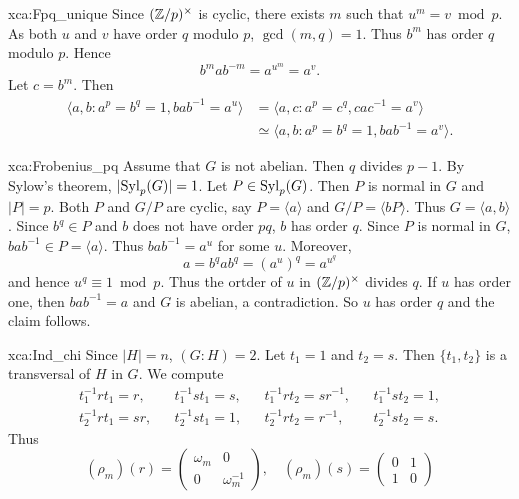 \begin{sol}{xca:Fpq_unique}
    Since $(\mathbb{Z}/p)^\times$ is cyclic, there exists $m$ such that $u^m=v\bmod p$. As both $u$ and $v$ have order $q$ modulo $p$, $\gcd(m,q)=1$. Thus $b^m$ has order $q$ modulo $p$. Hence 
    \[
    b^mab^{-m}=a^{u^m}=a^{v}.
    \]
    Let $c=b^m$. Then
    \begin{align*}
    \langle a,b:a^p=b^q=1,bab^{-1}=a^u\rangle 
    &= \langle a,c:a^p=c^q,cac^{-1}=a^v\rangle\\
    &\simeq \langle a,b:a^p=b^q=1,bab^{-1}=a^v\rangle.
    \end{align*}
\end{sol}

\begin{sol}{xca:Frobenius_pq}
    Assume that $G$ is not abelian. Then $q$ divides $p-1$. By Sylow's theorem, $|\mathrm{Syl}_p(G)|=1$. 
    Let $P\in\mathrm{Syl}_p(G)$. Then $P$ is normal in $G$ and $|P|=p$. 
    Both $P$ and $G/P$ are cyclic, say $P=\langle a\rangle$ and $G/P=\langle bP\rangle$. Thus 
    $G=\langle a,b\rangle$. Since $b^q\in P$ and $b$ does not have order $pq$, $b$ has order $q$. 
    Since $P$ is normal in $G$, $bab^{-1}\in P=\langle a\rangle$. Thus 
    $bab^{-1}=a^u$ for some $u$. Moreover, 
    \[
    a=b^qab^q=(a^u)^q=a^{u^q}
    \]
    and hence $u^q\equiv 1\bmod p$. Thus the ortder of $u$ in $(\mathbb{Z}/p)^\times$ divides $q$. 
    If $u$ has order one, then $bab^{-1}=a$ and $G$ is abelian, a contradiction. So 
    $u$ has order $q$ and the claim follows. 
\end{sol}


\begin{sol}{xca:Ind_chi}
    Since $|H|=n$, $(G:H)=2$. Let 
    $t_1=1$ and $t_2=s$. Then $\{t_1,t_2\}$ is a transversal of $H$ in $G$. We compute
    \begin{align*}
        t_1^{-1}rt_1=r, && t_1^{-1}st_1=s, && t_1^{-1}rt_2=sr^{-1},&& t_1^{-1}st_2=1, \\
        t_2^{-1}rt_1=sr,&& t_2^{-1}st_1=1,&&
        t_2^{-1}rt_2=r^{-1},&&t_2^{-1}st_2=s.
    \end{align*}
    Thus 
    \[
    (\rho_m)(r)=\begin{pmatrix}
    \omega_m & 0\\
    0&\omega_m^{-1}
    \end{pmatrix},\quad 
     (\rho_m)(s)=\begin{pmatrix}
     0&1\\
     1&0
    \end{pmatrix}
    \]
\end{sol}